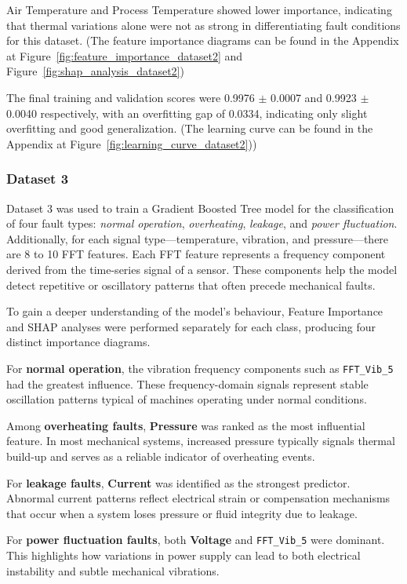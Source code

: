 \documentclass[11pt]{article}
\begin{document}
Air Temperature and Process Temperature showed lower importance, indicating that thermal variations alone were not as strong in differentiating fault conditions for this dataset. (The feature importance diagrams can be found in the Appendix at Figure~\ref{fig:feature_importance_dataset2} and Figure~\ref{fig:shap_analysis_dataset2})

The final training and validation scores were 0.9976 $\pm$ 0.0007 and 0.9923 $\pm$ 0.0040 respectively, with an overfitting gap of 0.0334, indicating only slight overfitting and good generalization. (The learning curve can be found in the Appendix at Figure~\ref{fig:learning_curve_dataset2}))

\subsubsection{Dataset 3}
Dataset 3 was used to train a Gradient Boosted Tree model for the classification of four fault types: \textit{normal operation}, \textit{overheating}, \textit{leakage}, and \textit{power fluctuation}. Additionally, for each signal type—temperature, vibration, and pressure—there are 8 to 10 FFT features. Each FFT feature represents a frequency component derived from the time-series signal of a sensor. These components help the model detect repetitive or oscillatory patterns that often precede mechanical faults.

To gain a deeper understanding of the model’s behaviour, Feature Importance and SHAP analyses were performed separately for each class, producing four distinct importance diagrams.

For \textbf{normal operation}, the vibration frequency components such as \texttt{FFT\_Vib\_5} had the greatest influence. These frequency-domain signals represent stable oscillation patterns typical of machines operating under normal conditions.

Among \textbf{overheating faults}, \textbf{Pressure} was ranked as the most influential feature. In most mechanical systems, increased pressure typically signals thermal build-up and serves as a reliable indicator of overheating events.

For \textbf{leakage faults}, \textbf{Current} was identified as the strongest predictor. Abnormal current patterns reflect electrical strain or compensation mechanisms that occur when a system loses pressure or fluid integrity due to leakage.

For \textbf{power fluctuation faults}, both \textbf{Voltage} and \texttt{FFT\_Vib\_5} were dominant. This highlights how variations in power supply can lead to both electrical instability and subtle mechanical vibrations.
\end{document}
